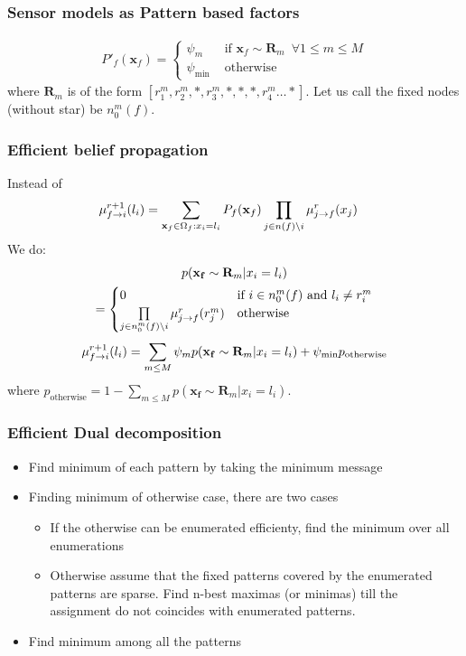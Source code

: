\documentclass{beamer}
\newcommand{\vect}[1]{\mathbf{#1}}
\newcommand{\map}{\vect{x}}
\begin{document}
\begin{frame}
  \frametitle{Sensor models as Pattern based factors}
  \begin{align}
    P'_f(\map_f) = \begin{cases}
      \psi_{m} & \text{ if $\map_f \sim \vect{R}_m$} \,\,\, \forall 1 \le m \le M\\
    \psi_{\text{min}} & \text{ otherwise}
    \end{cases}
    \label{eq:patternfunction}
  \end{align}
  where $\vect{R}_m$ is of the form  $[r^m_1, r^m_2, *, r^m_3, *, *, *, r^m_4 \dots *]$. Let us call the fixed nodes (without star) be $n^m_0(f)$.
\end{frame}
\begin{frame}
  \frametitle{Efficient belief propagation}
  Instead of 
  \begin{align}
    \bpmsg{f}{i}{l_i}{r+1} &= \sum_{\map_f \in \Omega_f: x_i = l_i}P_f(\map_f)\prod_{j \in n(f) \setminus i}\bpmsg{j}{f}{x_j}{r}
  \end{align}
  We do:
  \begin{multline}
    p(\vect{x_f} \sim \vect{R}_m|x_i = l_i) \\
    = \begin{cases}
      0 & \text{if $i \in n^m_0(f)$ and $l_i \ne r^m_i$}\\
  \prod\limits_{j \in n^m_0(f) \setminus i}\bpmsg{j}{f}{r^m_j}{r} & \text{otherwise}
    \end{cases}
  \end{multline}
  \begin{multline}
    \bpmsg{f}{i}{l_i}{r+1} = \sum_{m \le M} \psi_m p(\vect{x_f} \sim \vect{R}_m|x_i = l_i)
    + \psi_{\text{min}} p_{\text{otherwise}}
    \label{eq:efficientbp}
  \end{multline}
  where $p_{\text{otherwise}} = 1 - \sum_{m \le M}p(\vect{x_f} \sim \vect{R}_m|x_i = l_i)$.
\end{frame}

\begin{frame}
  \frametitle{Efficient Dual decomposition}
  \begin{itemize}
      \item Find minimum of each pattern by taking the minimum message 
      \item Finding minimum of otherwise case, there are two cases
        \begin{itemize}
          \item If the otherwise can be enumerated efficienty, find the minimum over all enumerations
          \item Otherwise assume that the fixed patterns covered by the enumerated patterns are sparse. Find n-best maximas (or minimas) till the assignment do not coincides with enumerated patterns.
        \end{itemize}
      \item Find minimum among all the patterns
  \end{itemize}
\end{frame}
\end{document}
